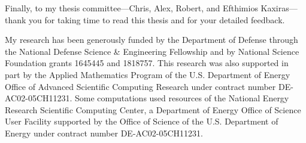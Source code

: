 Finally, to my thesis committee---Chris, Alex, Robert, and Efthimios Kaxiras---thank you for taking time to read this thesis and for your detailed feedback.

My research has been generously funded by the Department of Defense through the National Defense Science \& Engineering Fellowship and by National Science Foundation grants 1645445 and 1818757. This research was also supported in part by the Applied Mathematics Program of the U.S. Department of Energy Office of Advanced Scientific Computing Research under contract number DE-AC02-05CH11231. Some computations used resources of the National Energy Research Scientific Computing Center, a Department of Energy Office of Science User Facility supported by the Office of Science of the U.S. Department of Energy under contract number DE-AC02-05CH11231.

\endgroup

\cleardoublepage
